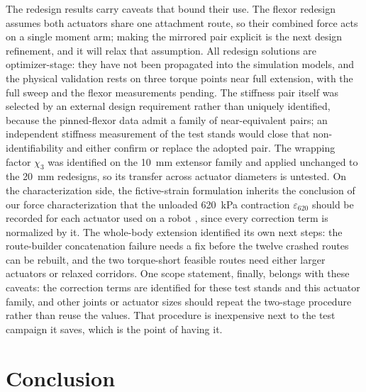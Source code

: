 The redesign results carry caveats that bound their use. The flexor redesign assumes both actuators share one attachment route, so their combined force acts on a single moment arm; making the mirrored pair explicit is the next design refinement, and it will relax that assumption. All redesign solutions are optimizer-stage: they have not been propagated into the simulation models, and the physical validation rests on three torque points near full extension, with the full sweep and the flexor measurements pending. The stiffness pair itself was selected by an external design requirement rather than uniquely identified, because the pinned-flexor data admit a family of near-equivalent pairs; an independent stiffness measurement of the test stands would close that non-identifiability and either confirm or replace the adopted pair. The wrapping factor $\chi_{3}$ was identified on the \diameter\qty{10}{\mm} extensor family and applied unchanged to the \diameter\qty{20}{\mm} redesigns, so its transfer across actuator diameters is untested. On the characterization side, the fictive-strain formulation inherits the conclusion of our force characterization that the unloaded \qty{620}{\kPa} contraction $\varepsilon_{620}$ should be recorded for each actuator used on a robot \citep{bolen_2026}, since every correction term is normalized by it. The whole-body extension identified its own next steps: the route-builder concatenation failure needs a fix before the twelve crashed routes can be rebuilt, and the two torque-short feasible routes need either larger actuators or relaxed corridors. One scope statement, finally, belongs with these caveats: the correction terms are identified for these test stands and this actuator family, and other joints or actuator sizes should repeat the two-stage procedure rather than reuse the values. That procedure is inexpensive next to the test campaign it saves, which is the point of having it.

\section{Conclusion}\label{sec:conclusion}

